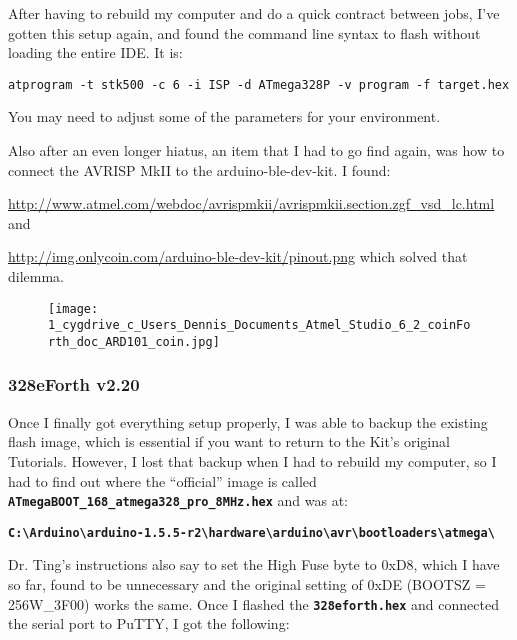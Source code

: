 \documentclass[10pt,english]{article}
\begin{document}
After having to rebuild my computer and do a quick contract between
jobs, I've gotten this setup again, and found the command line syntax
to flash without loading the entire IDE. It is:

\begin{lstlisting}
atprogram -t stk500 -c 6 -i ISP -d ATmega328P -v program -f target.hex
\end{lstlisting}


You may need to adjust some of the parameters for your environment.

Also after an even longer hiatus, an item that I had to go find again,
was how to connect the AVRISP MkII to the arduino-ble-dev-kit. I found:

\url{http://www.atmel.com/webdoc/avrispmkii/avrispmkii.section.zgf_vsd_lc.html}
and

\url{http://img.onlycoin.com/arduino-ble-dev-kit/pinout.png} which
solved that dilemma.

\begin{figure}


\caption{\protect\texttt{[image: 1\_cygdrive\_c\_Users\_Dennis\_Documents\_Atmel\_Studio\_6\_2\_coinForth\_doc\_ARD101\_coin.jpg]}}
\end{figure}



\subsubsection{328eForth v2.20}

Once I finally got everything setup properly, I was able to backup
the existing flash image, which is essential if you want to return
to the Kit's original Tutorials. However, I lost that backup when
I had to rebuild my computer, so I had to find out where the ``official''
image is called \texttt{\textbf{\small ATmegaBOOT\_168\_atmega328\_pro\_8MHz.hex}}
and was at:

\texttt{\textbf{\small C:\textbackslash{}Arduino\textbackslash{}arduino-1.5.5-r2\textbackslash{}hardware\textbackslash{}arduino\textbackslash{}avr\textbackslash{}bootloaders\textbackslash{}atmega\textbackslash{}}}{\small \par}

Dr. Ting's instructions also say to set the High Fuse byte to 0xD8,
which I have so far, found to be unnecessary and the original setting
of 0xDE (BOOTSZ = 256W\_3F00) works the same. Once I flashed the \texttt{\textbf{328eforth.hex}}
and connected the serial port to PuTTY, I got the following:
\end{document}
